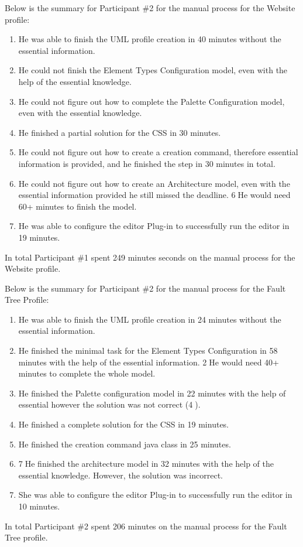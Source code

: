 Below is the summary for Participant \#2 for the manual process for the Website profile:
\begin{enumerate}
	\item He was able to finish the UML profile creation in 40 minutes without the essential information. 
	\item He could not finish the Element Types Configuration model, even with the help of the essential knowledge. 
	\item He could not figure out how to complete the Palette Configuration model, even with the essential knowledge. 
	\item He finished a partial solution for the CSS in 30 minutes.
	\item He could not figure out how to create a creation command, therefore essential information is provided, and he finished the step in 30 minutes in total.
	\item He could not figure out how to create an Architecture model, even with the essential information provided he still missed the deadline. \textcircled{6}He would need 60+ minutes to finish the model.
	\item He was able to configure the editor Plug-in to successfully run the editor in 19 minutes.
\end{enumerate}
In total Participant \#1 spent 249 minutes seconds on the manual process for the Website profile.

Below is the summary for Participant \#2 for the manual process for the Fault Tree Profile:

\begin{enumerate}
	\item He was able to finish the UML profile creation in 24 minutes without the essential information. 
	\item He finished the minimal task for the Element Types Configuration in 58 minutes with the help of the essential information. \textcircled{2}He would need 40+ minutes to complete the whole model.
	\item He finished the Palette configuration model in 22 minutes with the help of essential however the solution was not correct (\textcircled{4}).
	\item He finished a complete solution for the CSS in 19 minutes.
	\item He finished the creation command java class in 25 minutes.
	\item \textcircled{7}He finished the architecture model in 32 minutes with the help of the essential knowledge. However, the solution was incorrect.
	\item She was able to configure the editor Plug-in to successfully run the editor in 10 minutes.
\end{enumerate}
In total Participant \#2 spent 206 minutes on the manual process for the Fault Tree profile.


